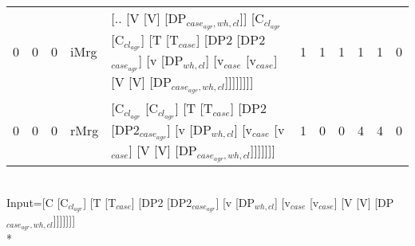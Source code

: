 \begin{tabularx}{\linewidth}{rrrlXrrrrrr}
   0 &       0 &   0 & iMrg  & [.. [V [V] [DP$_{case_{agr},wh,cl}$]] [C$_{cl_{agr}}$ [C$_{cl_{agr}}$] [T [T$_{case}$] [DP2 [DP2$_{case_{agr}}$] [v [DP$_{wh,cl}$] [v$_{case}$ [v$_{case}$] [V [V] [DP$_{case_{agr},wh,cl}$]]]]]]]]                                                                    &             1 &             1 &                  1 &           1 &           1 &               0 \\
   0 &       0 &   0 & rMrg  & [C$_{cl_{agr}}$ [C$_{cl_{agr}}$] [T [T$_{case}$] [DP2 [DP2$_{case_{agr}}$] [v [DP$_{wh,cl}$] [v$_{case}$ [v$_{case}$] [V [V] [DP$_{case_{agr},wh,cl}$]]]]]]]                                                                                                     &             1 &             0 &                  0 &           4 &           4 &               0 \\
\hline
\end{tabularx}\endgroup\\
\begingroup\scriptsize Input=[C [C$_{cl_{agr}}$] [T [T$_{case}$] [DP2 [DP2$_{case_{agr}}$] [v [DP$_{wh,cl}$] [v$_{case}$ [v$_{case}$] [V [V] [DP$_{case_{agr},wh,cl}$]]]]]]]\\*
